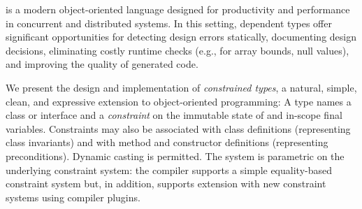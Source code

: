 \Xten{} is a modern object-oriented language designed for productivity and
performance in concurrent and distributed systems.  In this setting, dependent
types offer significant opportunities for detecting design errors statically,
documenting design decisions, eliminating costly runtime checks (e.g., for
array bounds, null values), and improving the quality of generated code.

We present the design and implementation of {\em constrained types},
a natural, simple, clean, and expressive extension to object-oriented
programming: A type  names a class or interface  and a {\em
constraint}  on the immutable state of  and in-scope final
variables.  Constraints may also be associated with class definitions
(representing class invariants) and with method and constructor definitions
(representing preconditions).  Dynamic casting is permitted.  The system is
parametric on the underlying constraint system: the compiler supports a simple
equality-based constraint system but, in addition, supports extension with new
constraint systems using compiler plugins.

